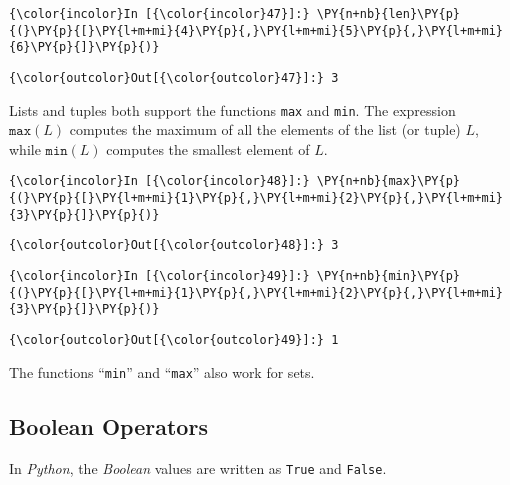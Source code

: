 \begin{Verbatim}[commandchars=\\\{\}]
{\color{incolor}In [{\color{incolor}47}]:} \PY{n+nb}{len}\PY{p}{(}\PY{p}{[}\PY{l+m+mi}{4}\PY{p}{,}\PY{l+m+mi}{5}\PY{p}{,}\PY{l+m+mi}{6}\PY{p}{]}\PY{p}{)}
\end{Verbatim}

\begin{Verbatim}[commandchars=\\\{\}]
{\color{outcolor}Out[{\color{outcolor}47}]:} 3
\end{Verbatim}
            
Lists and tuples both support the functions \texttt{max} and \texttt{min}. The expression
\(\texttt{max}(L)\) computes the maximum of all the elements of the list
(or tuple) \(L\), while \(\texttt{min}(L)\) computes the smallest
element of \(L\).

\begin{Verbatim}[commandchars=\\\{\}]
{\color{incolor}In [{\color{incolor}48}]:} \PY{n+nb}{max}\PY{p}{(}\PY{p}{[}\PY{l+m+mi}{1}\PY{p}{,}\PY{l+m+mi}{2}\PY{p}{,}\PY{l+m+mi}{3}\PY{p}{]}\PY{p}{)}
\end{Verbatim}


\begin{Verbatim}[commandchars=\\\{\}]
{\color{outcolor}Out[{\color{outcolor}48}]:} 3
\end{Verbatim}
            
\begin{Verbatim}[commandchars=\\\{\}]
{\color{incolor}In [{\color{incolor}49}]:} \PY{n+nb}{min}\PY{p}{(}\PY{p}{[}\PY{l+m+mi}{1}\PY{p}{,}\PY{l+m+mi}{2}\PY{p}{,}\PY{l+m+mi}{3}\PY{p}{]}\PY{p}{)}
\end{Verbatim}


\begin{Verbatim}[commandchars=\\\{\}]
{\color{outcolor}Out[{\color{outcolor}49}]:} 1
\end{Verbatim}
The functions ``\texttt{min}'' and ``\texttt{max}'' also work for sets.

\subsection{Boolean Operators}\label{boolean-operators}

In \textsl{Python}, the \emph{Boolean} values are written as \texttt{True} and \texttt{False}.

